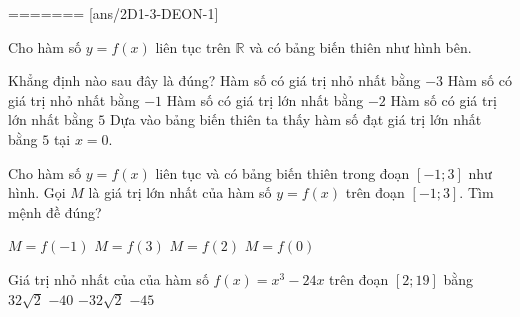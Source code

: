 =======
\boxde
\BTTN
{}[ans/2D1-3-DEON-1]
\begin{ex}%
    Cho hàm số $y=f(x)$ liên tục trên $\mathbb{R}$ và có bảng biến thiên như hình bên.
    \begin{center}
    \end{center}
    Khẳng định nào sau đây là đúng?
    \choice
    {Hàm số có giá trị nhỏ nhất bằng $-3$}
    {Hàm số có giá trị nhỏ nhất bằng $-1$}
    {Hàm số có giá trị lớn nhất bằng $-2$}
    {\True Hàm số có giá trị lớn nhất bằng $5$}
    \loigiai
    {
        Dựa vào bảng biến thiên ta thấy hàm số đạt giá trị lớn nhất bằng $5$ tại $x=0$.
    }
\end{ex}
\begin{ex}%
    Cho hàm số $y=f(x)$ liên tục và có bảng biến thiên trong đoạn $[-1;3]$ như hình. Gọi $M$ là giá trị lớn nhất của hàm số $y=f(x)$ trên đoạn $\left[-1;3\right]$. Tìm mệnh đề đúng?
    \begin{center}
    \end{center}
    \choice
    {$M=f(-1)$}
    {$M=f(3)$}
    {$M=f(2)$}
    {\True $M=f(0)$}
\end{ex}
\begin{ex}%
    Giá trị nhỏ nhất của của hàm số $f(x)=x^3-24x$ trên đoạn $[2;19]$ bằng
    \choice
    {$32\sqrt{2}$}
    {$-40$}
    {\True $-32\sqrt{2}$}
    {$-45$}
\end{ex}
